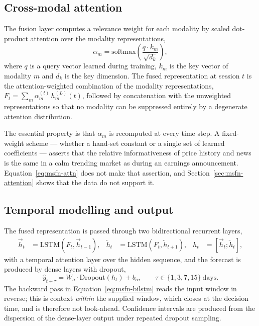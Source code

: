 \subsection{Cross-modal attention}

The fusion layer computes a relevance weight for each modality by scaled dot-product attention
over the modality representations,
\begin{equation}
\alpha_m = \mathrm{softmax}\!\left(\frac{q \cdot k_m}{\sqrt{d_k}}\right),
\label{eq:msfn-attn}
\end{equation}
where $q$ is a query vector learned during training, $k_m$ is the key vector of modality $m$ and
$d_k$ is the key dimension. The fused representation at session $t$ is the attention-weighted
combination of the modality representations,
$F_t = \sum_m \alpha_m^{(t)}\, h_m^{(L)}(t)$, followed by concatenation with the unweighted
representations so that no modality can be suppressed entirely by a degenerate attention
distribution.

The essential property is that $\alpha_m$ is recomputed at every time step. A fixed-weight
scheme --- whether a hand-set constant or a single set of learned coefficients --- asserts that
the relative informativeness of price history and news is the same in a calm trending market as
during an earnings announcement. Equation~\eqref{eq:msfn-attn} does not make that assertion, and
Section~\ref{sec:msfn-attention} shows that the data do not support it.

\subsection{Temporal modelling and output}

The fused representation is passed through two bidirectional recurrent layers,
\begin{align}
\overrightarrow{h}_t &= \mathrm{LSTM}(F_t, \overrightarrow{h}_{t-1}), &
\overleftarrow{h}_t &= \mathrm{LSTM}(F_t, \overleftarrow{h}_{t+1}), &
h_t &= [\overrightarrow{h}_t ; \overleftarrow{h}_t],
\label{eq:msfn-bilstm}
\end{align}
with a temporal attention layer over the hidden sequence, and the forecast is produced by dense
layers with dropout,
\begin{equation}
\hat{y}_{t+\tau} = W_o \cdot \mathrm{Dropout}(h_t) + b_o,
\qquad \tau \in \{1, 3, 7, 15\}\ \text{days}.
\label{eq:msfn-out}
\end{equation}
The backward pass in Equation~\eqref{eq:msfn-bilstm} reads the input window in reverse; this is
context \emph{within} the supplied window, which closes at the decision time, and is therefore
not look-ahead. Confidence intervals are produced from the dispersion of the dense-layer output
under repeated dropout sampling.

